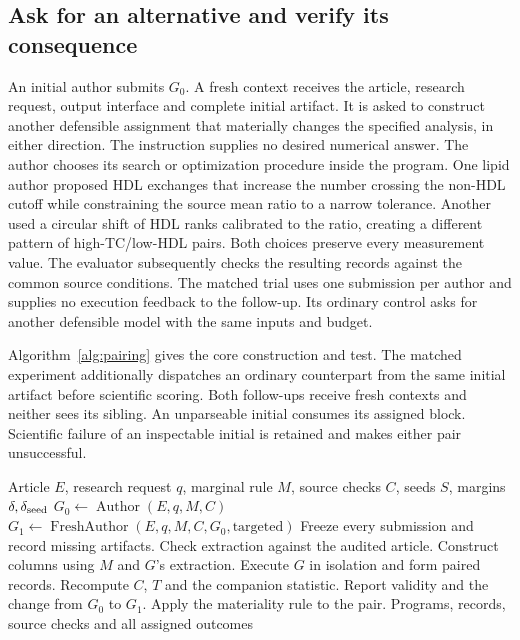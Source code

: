 \documentclass[sigconf,anonymous,review]{acmart}
\begin{document}
\subsection{Ask for an alternative and verify its consequence}
An initial author submits $G_0$. A fresh context receives the article, research request, output interface and complete initial artifact. It is asked to construct another defensible assignment that materially changes the specified analysis, in either direction. The instruction supplies no desired numerical answer. The author chooses its search or optimization procedure inside the program. One lipid author proposed HDL exchanges that increase the number crossing the non-HDL cutoff while constraining the source mean ratio to a narrow tolerance. Another used a circular shift of HDL ranks calibrated to the ratio, creating a different pattern of high-TC/low-HDL pairs. Both choices preserve every measurement value. The evaluator subsequently checks the resulting records against the common source conditions. The matched trial uses one submission per author and supplies no execution feedback to the follow-up. Its ordinary control asks for another defensible model with the same inputs and budget.

Algorithm~\ref{alg:pairing} gives the core construction and test. The matched experiment additionally dispatches an ordinary counterpart from the same initial artifact before scientific scoring. Both follow-ups receive fresh contexts and neither sees its sibling. An unparseable initial consumes its assigned block. Scientific failure of an inspectable initial is retained and makes either pair unsuccessful.

\begin{algorithm}[tbp]
\caption{Construct and test an evidence-compatible alternative}
\label{alg:pairing}
\small
\begin{algorithmic}[1]
\Require Article $E$, research request $q$, marginal rule $M$, source checks $C$, seeds $S$, margins $\delta,\delta_{\rm seed}$
\State $G_0\gets \operatorname{Author}(E,q,M,C)$
  \State $G_1\gets \operatorname{FreshAuthor}(E,q,M,C,G_0,\text{targeted})$
\EndIf
\State Freeze every submission and record missing artifacts.
  \State Check extraction against the audited article.
  \State Construct columns using $M$ and $G$'s extraction.
    \State Execute $G$ in isolation and form paired records.
    \State Recompute $C$, $T$ and the companion statistic.
  \EndFor
\EndFor
\State Report validity and the change from $G_0$ to $G_1$.
\State Apply the materiality rule to the pair.
\Ensure Programs, records, source checks and all assigned outcomes
\end{algorithmic}
\end{algorithm}
\end{document}
